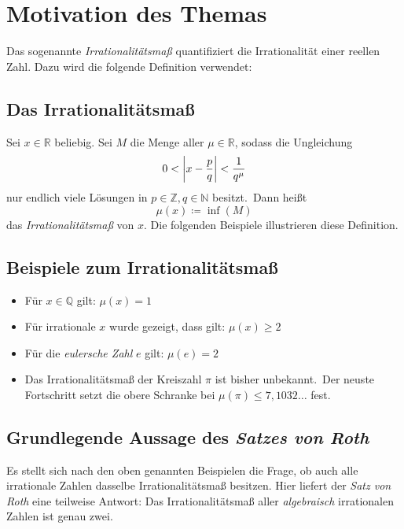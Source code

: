 
\section{Motivation des Themas}
    \label{sec:motivation}
    \textrm{Das sogenannte \emph{Irrationalitätsmaß} quantifiziert die Irrationalität einer reellen Zahl. Dazu wird
    die folgende Definition verwendet:}
    
    \subsection{\textrm{Das Irrationalitätsmaß}}
        \label{subsec:irr-measure}
        \textrm{Sei $x \in \mathbb{R}$ beliebig. Sei $M$ die Menge aller $\mu \in \mathbb{R}$, sodass die Ungleichung
            \begin{equation*}
                0 < \left| x - \frac{p}{q} \right| < \frac{1}{q^\mu}
            \end{equation*}
            nur endlich viele Lösungen in $p \in \mathbb{Z}, q \in \mathbb{N}$
            besitzt.\ Dann heißt
            \begin{equation*}
                \mu(x) \coloneqq \inf(M)
            \end{equation*}
            das \emph{Irrationalitätsmaß} von $x$.
            \newline
            Die folgenden Beispiele illustrieren diese Definition.}
    
    \subsection{\textrm{Beispiele zum Irrationalitätsmaß}}
        \label{subsec:examples-irr-measure}
        \begin{itemize}
            \item \textrm{Für $x \in \mathbb{Q}$ gilt: $\mu(x) = 1$}
            \item \textrm{Für irrationale $x$ wurde gezeigt, dass gilt: $\mu(x) \geq 2$}
            \item \textrm{Für die \emph{eulersche Zahl} $e$ gilt: $\mu(e) = 2$}
            \item \textrm{Das Irrationalitätsmaß der Kreiszahl $\pi$ ist bisher unbekannt.\ Der neuste Fortschritt
            setzt die obere Schranke bei $\mu(\pi) \leq 7,1032\dots$ fest.}
        \end{itemize}
    
    \subsection{Grundlegende Aussage des \emph{Satzes von Roth}}
        \label{subsec:basically-svr}
        \textrm{Es stellt sich nach den oben genannten Beispielen die Frage, ob auch alle irrationale Zahlen dasselbe
        Irrationalitätsmaß besitzen. Hier liefert der \emph{Satz von Roth} eine teilweise Antwort:
        \newline
        Das Irrationalitätsmaß aller \emph{algebraisch} irrationalen Zahlen ist genau zwei.}
    
